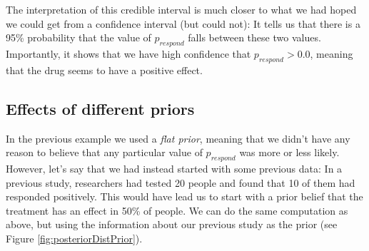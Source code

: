 \documentclass[]{book}
\theoremstyle{definition}
\theoremstyle{definition}
\theoremstyle{definition}
\theoremstyle{remark}
\begin{document}
The interpretation of this credible interval is much closer to what we
had hoped we could get from a confidence interval (but could not): It
tells us that there is a 95\% probability that the value of
\(p_{respond}\) falls between these two values. Importantly, it shows
that we have high confidence that \(p_{respond} > 0.0\), meaning that
the drug seems to have a positive effect.

\subsection{Effects of different
priors}\label{effects-of-different-priors}

In the previous example we used a \emph{flat prior}, meaning that we
didn't have any reason to believe that any particular value of
\(p_{respond}\) was more or less likely. However, let's say that we had
instead started with some previous data: In a previous study,
researchers had tested 20 people and found that 10 of them had responded
positively. This would have lead us to start with a prior belief that
the treatment has an effect in 50\% of people. We can do the same
computation as above, but using the information about our previous study
as the prior (see Figure \ref{fig:posteriorDistPrior}).
\end{document}
